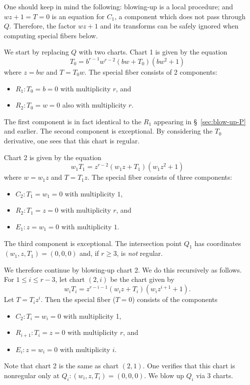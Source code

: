 \documentclass[pagesize,paper=letter]{scrartcl}
\theoremstyle{plain}
\theoremstyle{definition}
\theoremstyle{remark}
\begin{document}
One should keep in mind the following: blowing-up is a local procedure; and $wz + 1 = T = 0$ is an equation for $C_1$, a component which does not pass through $Q$. Therefore, the factor $wz + 1$ and its transforms can be safely ignored when computing special fibers below.

We start by replacing $Q$ with two charts. Chart 1 is given by the equation
\[
T_0 = b^{r-1}w^{r-2}(bw + T_0)(bw^2 + 1)
\]
where $z = bw$ and $T = T_0w$. The special fiber consists of 2 components:
\begin{itemize}
    \item $R_1: T_0 = b = 0$ with multiplicity $r$, and
    \item $R_2: T_0 = w = 0$ also with multiplicity $r$.
\end{itemize}
The first component is in fact identical to the $R_1$ appearing in \S~\ref{sec:blow-up-P} and earlier. The second component is exceptional. By considering the $T_0$ derivative, one sees that this chart is regular.

Chart 2 is given by the equation
\[
w_1 T_1 = z^{r-2}(w_1z + T_1)(w_1 z^2 + 1)
\]
where $w = w_1 z$ and $T = T_1 z$. The special fiber consists of three components:
\begin{itemize}
    \item $C_2: T_1 = w_1 = 0$ with multiplicity $1$,
    \item $R_2: T_1 = z = 0$ with multiplicity $r$, and
    \item $E_1: z = w_1 = 0$ with multiplicity $1$.
\end{itemize}
The third component is exceptional. The intersection point $Q_1$ has coordinates $(w_1, z, T_1) = (0,0,0)$ and, if $r \geq 3$, is \emph{not} regular.

We therefore continue by blowing-up chart 2. We do this recursively as follows. For $1 \leq i \leq r-3$, let chart $(2,i)$ be the chart given by
  \[
  w_i T_i = z^{r-i-1} (w_i z + T_i) (w_i z^{i+1} + 1).
  \]
  Let $T = T_i z^i$. Then the special fiber ($T = 0$) consists of the components
  \begin{itemize}
      \item $C_2: T_i = w_i = 0$ with multiplicity 1,
      \item $R_{i+1}: T_i = z = 0$ with multiplicity $r$, and
      \item $E_i: z = w_i = 0$ with multiplicity $i$.
  \end{itemize}
  Note that chart 2 is the same as chart $(2,1)$. One verifies that this chart is nonregular only at $Q_i: (w_i, z, T_i) = (0, 0, 0)$. We blow up $Q_i$ via 3 charts.
\end{document}
